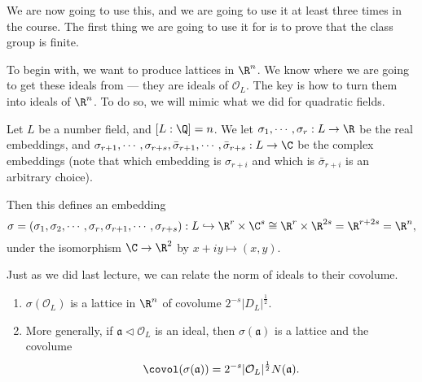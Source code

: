 \documentclass[a4paper]{article}
\begin{document}
We are now going to use this, and we are going to use it at least three times in the course. The first thing we are going to use it for is to prove that the class group is finite.

To begin with, we want to produce lattices in $\R^n$. We know where we are going to get these ideals from --- they are ideals of $\mathcal{O}_L$. The key is how to turn them into ideals of $\R^n$. To do so, we will mimic what we did for quadratic fields.

Let $L$ be a number field, and $[L:\Q] = n$. We let $\sigma_1, \cdots,\sigma_r: L \to \R$ be the real embeddings, and $\sigma_{r + 1}, \cdots, \sigma_{r + s},\bar{\sigma}_{r + 1}, \cdots, \bar{\sigma}_{r + s}: L \to \C$ be the complex embeddings (note that which embedding is $\sigma_{r + i}$ and which is $\bar{\sigma}_{r + i}$ is an arbitrary choice).

Then this defines an embedding
\[
  \sigma = (\sigma_1, \sigma_2, \cdots, \sigma_r, \sigma_{r + 1}, \cdots, \sigma_{r + s}): L \hookrightarrow \R^r \times \C^s \cong \R^r \times \R^{2s} = \R^{r + 2s} = \R^n,
\]
under the isomorphism $\C \to \R^2$ by $x + iy \mapsto (x, y)$.

Just as we did last lecture, we can relate the norm of ideals to their covolume.

\begin{lemma}\leavevmode
  \begin{enumerate}
    \item $\sigma(\mathcal{O}_L)$ is a lattice in $\R^n$ of covolume $2^{-s} |D_L|^{\frac{1}{2}}$.
    \item More generally, if $\mathfrak{a} \lhd \mathcal{O}_L$ is an ideal, then $\sigma(\mathfrak{a})$ is a lattice and the covolume
      \[
        \covol(\sigma(\mathfrak{a})) = 2^{-s} |\mathcal{O}_L|^{\frac{1}{2}} N(\mathfrak{a}).
      \]
  \end{enumerate}
\end{lemma}
\end{document}
